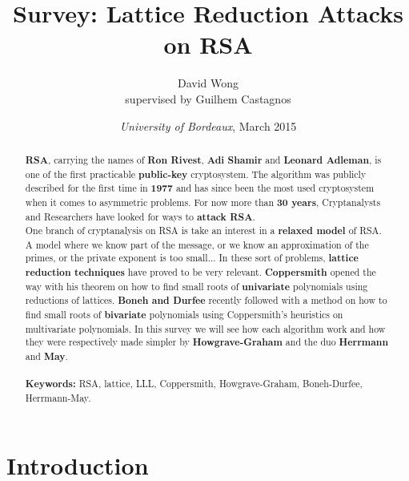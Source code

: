\documentclass[a4paper,11pt]{article}
\title{Survey: Lattice Reduction Attacks on RSA}
\author{David Wong\\
\small{supervised by Guilhem Castagnos}}
\date{\emph{University of Bordeaux}, March 2015}
\begin{document}
\maketitle

\renewcommand{\abstractname}{Abstract}
\begin{abstract}
\textbf{RSA}, carrying the names of \textbf{Ron Rivest}, \textbf{Adi Shamir} and \textbf{Leonard Adleman}, is one of the first practicable \textbf{public-key} cryptosystem. The algorithm was publicly described for the first time in \textbf{1977} and has since been the most used cryptosystem when it comes to asymmetric problems. For now more than \textbf{30 years}, Cryptanalysts and Researchers have looked for ways to \textbf{attack RSA}.\\
One branch of cryptanalysis on RSA is take an interest in a \textbf{relaxed model} of RSA. A model where we know part of the message, or we know an approximation of the primes, or the private exponent is too small... In these sort of problems, \textbf{lattice reduction techniques} have proved to be very relevant. \textbf{Coppersmith} opened the way with his theorem on how to find small roots of \textbf{univariate} polynomials using reductions of lattices. \textbf{Boneh and Durfee} recently followed with a method on how to find small roots of \textbf{bivariate} polynomials using Coppersmith's heuristics on multivariate polynomials. In this survey we will see how each algorithm work and how they were respectively made simpler by \textbf{Howgrave-Graham} and the duo \textbf{Herrmann} and \textbf{May}.\\
\\
\textbf{Keywords:} RSA, lattice, LLL, Coppersmith, Howgrave-Graham, Boneh-Durfee, Herrmann-May.\\

\end{abstract}

\section{Introduction}\label{introduction}
\end{document}
